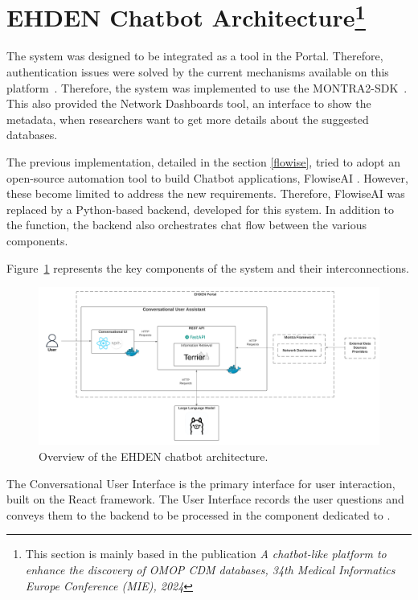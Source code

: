 
 


\section{EHDEN Chatbot Architecture\protect\footnote{This section is mainly based in the publication \textit{A chatbot-like platform to enhance the
discovery of OMOP CDM databases, 34th Medical Informatics Europe Conference (MIE), 2024}}}


The system was designed to be integrated as a tool in the {\ehden} Portal. Therefore, authentication issues were solved by the current mechanisms available on this platform~\cite{almeida2024federated}. Therefore, the system was implemented to use the MONTRA2-SDK~\cite{almeida2024montra2}. This also provided the Network Dashboards tool, an interface to show the metadata, when researchers want to get more details about the suggested databases. 

The previous implementation, detailed in the section \ref{flowise}, tried to adopt an open-source automation tool to build Chatbot applications, FlowiseAI \cite{reis2024flowise}. However, these become limited to address the new requirements. Therefore, FlowiseAI was replaced by a Python-based backend, developed for this system. In addition to the {\ir} function, the backend also orchestrates chat flow between the various components.

Figure~\ref{fig_arch} represents the key components of the system and their interconnections.

\begin{figure}[H]
    \includegraphics[width=1\textwidth]{figs/chapter3/architecture.png}
    \centering
    \caption{Overview of the EHDEN chatbot architecture.}
    \label{fig_arch}
\end{figure}

The Conversational User Interface is the primary interface for user interaction, built on the React framework. The User Interface records the user questions and conveys them to the backend to be processed in the component dedicated to {\ir}. 

